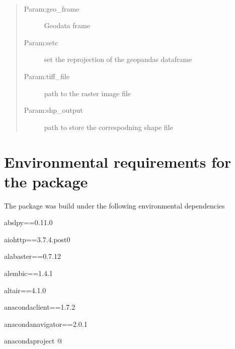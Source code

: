 \documentclass[letterpaper,10pt,english]{sphinxmanual}
\begin{document}
\begin{fulllineitems}
\label{\detokenize{tutorial:standardize_plot}}~\begin{quote}\begin{description}
\item[{Param:geo\_frame}] \leavevmode
\sphinxAtStartPar
Geodata frame

\item[{Param:setc}] \leavevmode
\sphinxAtStartPar
set the reprojection of the geopandas dataframe

\item[{Param:tiff\_file}] \leavevmode
\sphinxAtStartPar
path to the raster image file

\item[{Param:shp\_output}] \leavevmode
\sphinxAtStartPar
path to store the correspodning shape file

\end{description}\end{quote}

\end{fulllineitems}



\section{Environmental requirements for the package}
\label{\detokenize{requirements:environmental-requirements-for-the-package}}\label{\detokenize{requirements::doc}}
\sphinxAtStartPar
The package was build under the following environmental dependencies

\sphinxAtStartPar
absl\sphinxhyphen{}py==0.11.0

\sphinxAtStartPar
aiohttp==3.7.4.post0

\sphinxAtStartPar
alabaster==0.7.12

\sphinxAtStartPar
alembic==1.4.1

\sphinxAtStartPar
altair==4.1.0

\sphinxAtStartPar
anaconda\sphinxhyphen{}client==1.7.2

\sphinxAtStartPar
anaconda\sphinxhyphen{}navigator==2.0.1

\sphinxAtStartPar
anaconda\sphinxhyphen{}project @ 
\end{document}
